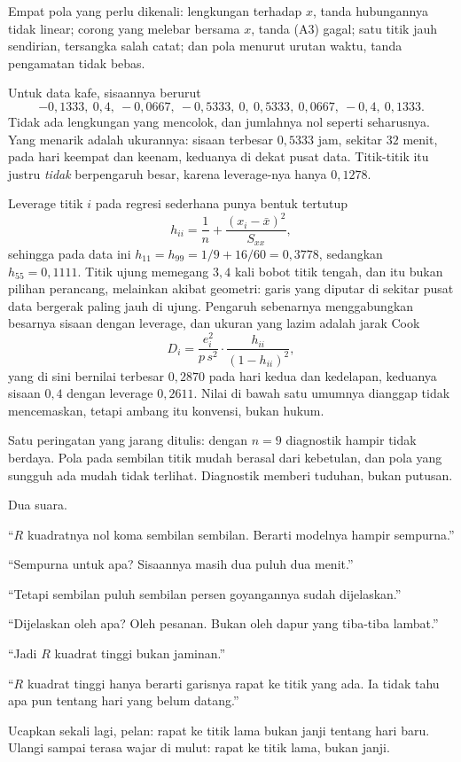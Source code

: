 Empat pola yang perlu dikenali: lengkungan terhadap $x$, tanda hubungannya tidak linear;
corong yang melebar bersama $x$, tanda (A3) gagal; satu titik jauh sendirian, tersangka
salah catat; dan pola menurut urutan waktu, tanda pengamatan tidak bebas.

Untuk data kafe, sisaannya berurut
\[
-0{,}1333,\ 0{,}4,\ -0{,}0667,\ -0{,}5333,\ 0,\ 0{,}5333,\ 0{,}0667,\ -0{,}4,\ 0{,}1333 .
\]
Tidak ada lengkungan yang mencolok, dan jumlahnya nol seperti seharusnya. Yang menarik
adalah ukurannya: sisaan terbesar $0{,}5333$ jam, sekitar $32$ menit, pada hari keempat
dan keenam, keduanya di dekat pusat data. Titik-titik itu justru \emph{tidak}
berpengaruh besar, karena leverage-nya hanya $0{,}1278$.

Leverage titik $i$ pada regresi sederhana punya bentuk tertutup
\[
h_{ii}=\frac1n+\frac{(x_i-\bar x)^2}{S_{xx}},
\]
sehingga pada data ini $h_{11}=h_{99}=1/9+16/60=0{,}3778$, sedangkan $h_{55}=0{,}1111$.
Titik ujung memegang $3{,}4$ kali bobot titik tengah, dan itu bukan pilihan perancang,
melainkan akibat geometri: garis yang diputar di sekitar pusat data bergerak paling
jauh di ujung. Pengaruh sebenarnya menggabungkan besarnya sisaan dengan leverage,
dan ukuran yang lazim adalah jarak Cook
\[
D_i=\frac{e_i^2}{p\,s^2}\cdot\frac{h_{ii}}{(1-h_{ii})^2},
\]
yang di sini bernilai terbesar $0{,}2870$ pada hari kedua dan kedelapan, keduanya
sisaan $0{,}4$ dengan leverage $0{,}2611$. Nilai di bawah satu umumnya dianggap tidak
mencemaskan, tetapi ambang itu konvensi, bukan hukum.

Satu peringatan yang jarang ditulis: dengan $n=9$ diagnostik hampir tidak berdaya.
Pola pada sembilan titik mudah berasal dari kebetulan, dan pola yang sungguh ada mudah
tidak terlihat. Diagnostik memberi tuduhan, bukan putusan.

\begin{bacakeras}
Dua suara.

``$R$ kuadratnya nol koma sembilan sembilan. Berarti modelnya hampir sempurna.''

``Sempurna untuk apa? Sisaannya masih dua puluh dua menit.''

``Tetapi sembilan puluh sembilan persen goyangannya sudah dijelaskan.''

``Dijelaskan oleh apa? Oleh pesanan. Bukan oleh dapur yang tiba-tiba lambat.''

``Jadi $R$ kuadrat tinggi bukan jaminan.''

``$R$ kuadrat tinggi hanya berarti garisnya rapat ke titik yang ada. Ia tidak tahu
apa pun tentang hari yang belum datang.''

Ucapkan sekali lagi, pelan: rapat ke titik lama bukan janji tentang hari baru. Ulangi
sampai terasa wajar di mulut: rapat ke titik lama, bukan janji.
\end{bacakeras}

